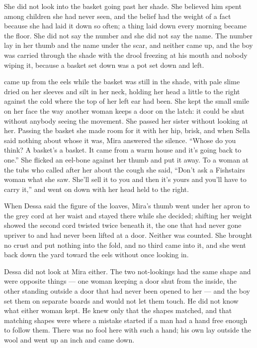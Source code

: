 She did not look into the basket going past her shade. She believed him spent among children she had never seen, and the belief had the weight of a fact because she had laid it down so often; a thing laid down every morning became the floor. She did not say the number and she did not say the name. The number lay in her thumb and the name under the scar, and neither came up, and the boy was carried through the shade with the drool freezing at his mouth and nobody wiping it, because a basket set down was a pot set down and left.

\scenebreak

 came up from the eels while the basket was still in the shade, with pale slime dried on her sleeves and silt in her neck, holding her head a little to the right against the cold where the top of her left ear had been. She kept the small smile on her face the way another woman keeps a door on the latch: it could be shut without anybody seeing the movement. She passed her sister without looking at her. Passing the basket she made room for it with her hip, brisk, and when Sella said nothing about whose it was, Mira answered the silence. “Whose do you think? A basket's a basket. It came from a warm house and it's going back to one.” She flicked an eel-bone against her thumb and put it away. To a woman at the tubs who called after her about the cough she said, “Don't ask a Fishstairs woman what she saw. She'll sell it to you and then it's yours and you'll have to carry it,” and went on down with her head held to the right.

When Dessa said the figure of the loaves, Mira's thumb went under her apron to the grey cord at her waist and stayed there while she decided; shifting her weight showed the second cord twisted twice beneath it, the one that had never gone upriver to  and had never been lifted at a door. Neither was counted. She brought no crust and put nothing into the fold, and no third came into it, and she went back down the yard toward the eels without once looking in.

Dessa did not look at Mira either. The two not-lookings had the same shape and were opposite things --- one woman keeping a door shut from the inside, the other standing outside a door that had never been opened to her --- and the boy set them on separate boards and would not let them touch. He did not know what either woman kept. He knew only that the shapes matched, and that matching shapes were where a mistake started if a man had a hand free enough to follow them. There was no fool here with such a hand; his own lay outside the wool and went up an inch and came down.

